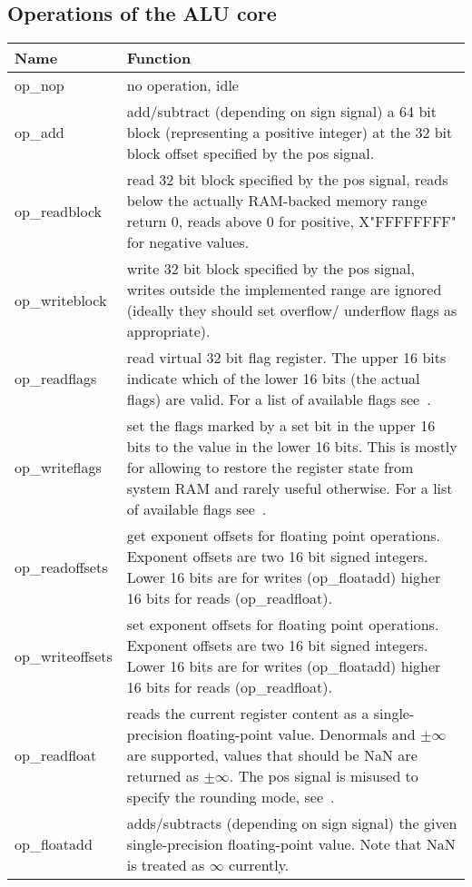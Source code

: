 \subsection{Operations of the ALU core}
\renewcommand\tabline[2]{#1 & #2\\ \hline}
\begin{center}
\begin{tabular}{|l|p{}|}
\hline
\tabline {Name}  {Function}
\hline
\tabline {op\_nop} {no operation, idle}
\tabline {op\_add} {
    add/subtract (depending on sign signal) a 64 bit block
    (representing a positive integer) at the 32 bit block offset
    specified by the pos signal.}
\tabline {op\_readblock} {
    read 32 bit block specified by the pos signal, reads
    below the actually RAM-backed memory range return 0,
    reads above 0 for positive, X"FFFFFFFF" for negative values.}
\tabline {op\_writeblock} {
    write 32 bit block specified by the pos signal, writes outside
    the implemented range are ignored (ideally they should set overflow/
    underflow flags as appropriate).}
\tabline {op\_readflags} {
    read virtual 32 bit flag register. The upper 16 bits indicate
    which of the lower 16 bits (the actual flags) are valid.
    For a list of available flags see~\fref{tab:flags}.}
\tabline {op\_writeflags} {
    set the flags marked by a set bit in the upper 16 bits to
    the value in the lower 16 bits.
    This is mostly for allowing to restore the register state from system
    RAM and rarely useful otherwise.
    For a list of available flags see~\fref{tab:flags}.}
\tabline {op\_readoffsets} {
    get exponent offsets for floating point operations.
    Exponent offsets are two 16 bit signed integers.
    Lower 16 bits are for writes (op\_floatadd) higher 16 bits for reads (op\_readfloat).}
\tabline {op\_writeoffsets} {
    set exponent offsets for floating point operations.
    Exponent offsets are two 16 bit signed integers.
    Lower 16 bits are for writes (op\_floatadd) higher 16 bits for reads (op\_readfloat).}
\tabline {op\_readfloat} {
    reads the current register content as a single-precision
    floating-point value. Denormals and $\pm\infty$ are supported, values that should
    be NaN are returned as $\pm\infty$.
    The pos signal is misused to specify the rounding mode, see~\fref{tab:round}.}
\tabline {op\_floatadd} {
    adds/subtracts (depending on sign signal) the given
    single-precision floating-point value. Note that NaN is treated as $\infty$
    currently.}
\end{tabular}
\end{center}

